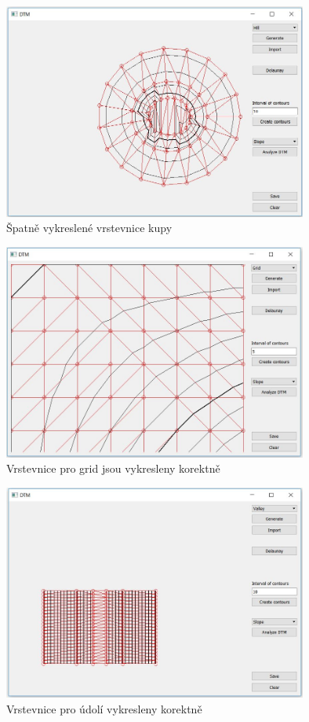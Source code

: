\documentclass[a4paper, 12pt]{article}
\begin{document}
\begin{figure}[h!]
\centering
\includegraphics[width=10cm]{pictures/hill_bad.jpg}
\caption{Špatně vykreslené vrstevnice kupy}
\end{figure}

\begin{figure}[h!]
\centering
\includegraphics[width=10cm]{pictures/grid_ok.jpg}
\caption{Vrstevnice pro grid jsou vykresleny korektně}
\end{figure}

\begin{figure}[h!]
\centering
\includegraphics[width=10cm]{pictures/valley_ok.jpg}
\caption{Vrstevnice pro údolí vykresleny korektně}
\end{figure}
\end{document}
